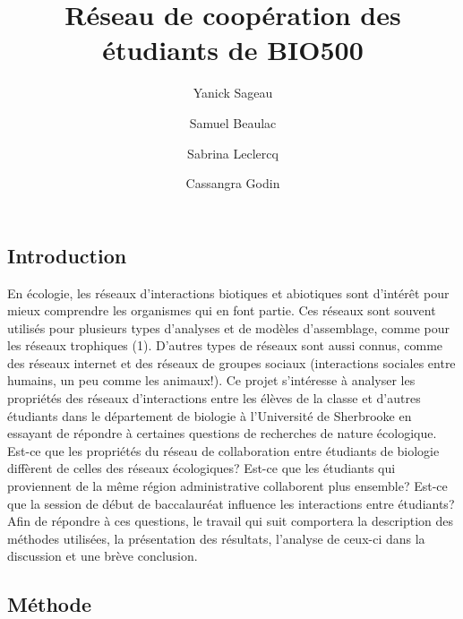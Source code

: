 \documentclass[9pt,twocolumn,twoside,]{pnas-new}
\title{Réseau de coopération des étudiants de BIO500}
\author[a]{Yanick Sageau}
\author[a]{Samuel Beaulac}
\author[a]{Sabrina Leclercq}
\author[a]{Cassangra Godin}
\affil[a]{Université de Sherbrooke, Département de biologie, Bd de
L'Université, Sherbrooke, Québec, J1K2R1}
\begin{document}
\verticaladjustment{-2pt}



\maketitle
\thispagestyle{firststyle}


\acknow{}

\hypertarget{introduction}{%
\subsection{Introduction}\label{introduction}}

En écologie, les réseaux d'interactions biotiques et abiotiques sont
d'intérêt pour mieux comprendre les organismes qui en font partie. Ces
réseaux sont souvent utilisés pour plusieurs types d'analyses et de
modèles d'assemblage, comme pour les réseaux trophiques (1). D'autres
types de réseaux sont aussi connus, comme des réseaux internet et des
réseaux de groupes sociaux (interactions sociales entre humains, un peu
comme les animaux!). Ce projet s'intéresse à analyser les propriétés des
réseaux d'interactions entre les élèves de la classe et d'autres
étudiants dans le département de biologie à l'Université de Sherbrooke
en essayant de répondre à certaines questions de recherches de nature
écologique. Est-ce que les propriétés du réseau de collaboration entre
étudiants de biologie diffèrent de celles des réseaux écologiques?
Est-ce que les étudiants qui proviennent de la même région
administrative collaborent plus ensemble? Est-ce que la session de début
de baccalauréat influence les interactions entre étudiants? Afin de
répondre à ces questions, le travail qui suit comportera la description
des méthodes utilisées, la présentation des résultats, l'analyse de
ceux-ci dans la discussion et une brève conclusion.

\hypertarget{muxe9thode}{%
\subsection{Méthode}\label{muxe9thode}}
\end{document}
